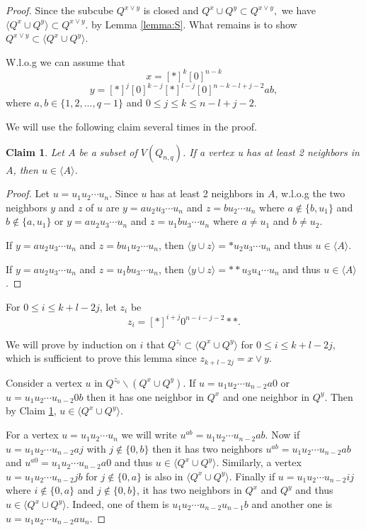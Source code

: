 \documentclass[reqno,11pt]{amsart}
\newtheorem{claim}[theorem]{Claim}
\renewcommand{\leq}{\leqslant}
\begin{document}
\begin{proof}
 Since the subcube $Q^{x \vee y}$  is closed and $Q^x \cup Q^y \subset Q^{x \vee y},$ we have 
 $\langle Q^x \cup Q^y \rangle \subset Q^{x \vee y}.$ by Lemma \ref{lemma:S}. What remains is to show $ Q^{x \vee y} \subset \langle Q^x \cup Q^y \rangle$. 
 
 W.l.o.g we can assume that 
 $$x=[\ast]^k[0]^{n-k}$$
 $$y=[\ast]^j[0]^{k-j}[\ast]^{l-j}[0]^{n-k-l+j-2}ab,$$
where $a,b\in \{1,2,...,q-1\}$ and $0 \leq j \leq k \leq n-l+j-2$. 

We will use the following claim several times in the proof.
\begin{claim} \label{claim:A be a subset}
Let $A$ be a subset of $V(Q_{n,q})$. If a vertex u has at least 2 neighbors in $A$, then $u \in \langle  A \rangle$. 
\end{claim}
\begin{proof}
Let $u=u_1u_2\cdots u_n$. Since $u$ has at least 2 neighbors in $A$, w.l.o.g the two neighbors $y$ and $z$ of $u$ are $y=au_2u_3\cdots u_n$ and $z=bu_2\cdots u_n$ where $a \notin \{b,u_1\}$ and $b \notin \{a,u_1\}$ or $y=au_{2}u_{3}\cdots u_n$ and $z=u_{1}bu_{3}\cdots u_{n}$ where $a \neq u_1$ and $b \neq u_2$. 

If $y=au_2u_3\cdots u_n$ and $z=bu_1u_2\cdots u_n$, then $\langle y \cup z \rangle =\ast u_2u_3 \cdots u_n$ and thus $u \in \langle A \rangle$. 

If $y=au_{2}u_{3}\cdots u_n$ and $z=u_{1}bu_{3}\cdots u_{n}$, then $\langle y \cup z \rangle =\ast \ast u_3u_4\cdots u_n$ and thus $u \in \langle A \rangle$.  \end{proof}

For $ 0 \leq  i \leq k+l-2j$, let $z_i$ be 
$$z_i=[\ast]^{i+j}0^{n-i-j-2}\ast \ast.$$

We will prove by induction on $i$ that $Q^{z_i} \subset \langle Q^x \cup Q^y \rangle$ for $ 0 \leq i \leq k+l-2j$, which is sufficient to prove this lemma since $z_{k+l-2j}=x \vee y$.

Consider a vertex $u$ in $Q^{z_0} \backslash (Q^x \cup Q^y)$. If $u=u_1 u_2 \cdots u_{n-2}a0$ or $u=u_1 u_2\cdots u_{n-2}0b$ then it has one neighbor in $Q^{x}$ and one neighbor in $Q^{y}$. Then by Claim \ref{claim:A be a subset}, $u \in \langle Q^x \cup Q^y \rangle$. 

For a vertex $u=u_1u_2\cdots u_n$ we will write $u^{ab}=u_1u_2\cdots u_{n-2}ab$. Now if $u=u_1 u_2 \cdots u_{n-2}aj$ with $j \notin \{0,b\}$ then it has two neighbors $u^{ab}=u_1u_2 \cdots u_{n-2}ab$ and $u^{a0}=u_1u_2\cdots u_{n-2}a0$ and thus $u \in \langle Q^x \cup Q^y \rangle$. Similarly, a vertex $u=u_1u_2 \cdots u_{n-2}jb$ for $j \notin \{0,a\}$ is also in $\langle Q^x \cup Q^y \rangle$. Finally if $u=u_1u_2 \cdots u_{n-2} ij$ where $i \notin \{0,a\}$ and $j \notin \{0,b\}$, it has two neighbors in $Q^x$ and $Q^y$ and thus $u \in \langle Q^x \cup Q^y \rangle$. Indeed, one of them is $u_1u_2 \cdots u_{n-2} u_{n-1}b$ and another one is $u=u_1u_2 \cdots u_{n-2} au_{n}$.


\end{proof}
\end{document}
